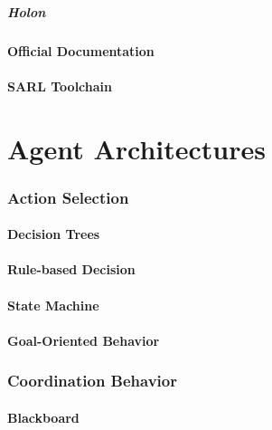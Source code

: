\begin{bibliographysection}
	\subsubsection{Holon}
	
	\subsection{Official Documentation}
	
	\subsection{SARL Toolchain}
	

\end{bibliographysection}

\part[author={Prof.Dr. Nicolas GAUD}]{Agent Architectures}
\begin{bibliographysection}

	\section{Action Selection}
	\subsection{Decision Trees}
	
	\subsection{Rule-based Decision}
	
	\subsection{State Machine}
	
	\subsection{Goal-Oriented Behavior}
	

	\section{Coordination Behavior}
	\subsection{Blackboard}
	

\end{bibliographysection}

